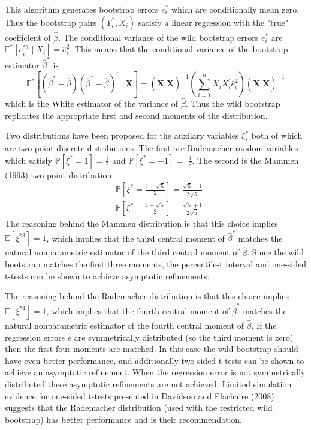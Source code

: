 \documentclass[10pt]{article}
\begin{document}
This algorithm generates bootstrap errors $e_{i}^{*}$ which are conditionally mean zero. Thus the bootstrap pairs $\left(Y_{i}^{*}, X_{i}\right)$ satisfy a linear regression with the "true" coefficient of $\widehat{\beta}$. The conditional variance of the wild bootstrap errors $e_{i}^{*}$ are $\mathbb{E}^{*}\left[e_{i}^{* 2} \mid X_{i}\right]=\widehat{e}_{i}^{2}$. This means that the conditional variance of the bootstrap estimator $\widehat{\beta}^{*}$ is
$$
\mathbb{E}^{*}\left[\left(\widehat{\beta}^{*}-\widehat{\beta}\right)\left(\widehat{\beta}^{*}-\widehat{\beta}\right)^{\prime} \mid \boldsymbol{X}\right]=\left(\boldsymbol{X}^{\prime} \boldsymbol{X}\right)^{-1}\left(\sum_{i=1}^{n} X_{i} X_{i}^{\prime} \widehat{e}_{i}^{2}\right)\left(\boldsymbol{X}^{\prime} \boldsymbol{X}\right)^{-1}
$$
which is the White estimator of the variance of $\widehat{\beta}$. Thus the wild bootstrap replicates the appropriate first and second moments of the distribution.

Two distributions have been proposed for the auxilary variables $\xi_{i}^{*}$ both of which are two-point discrete distributions. The first are Rademacher random variables which satisfy $\mathbb{P}\left[\xi^{*}=1\right]=\frac{1}{2}$ and $\mathbb{P}\left[\xi^{*}=-1\right]=$ $\frac{1}{2}$. The second is the Mammen (1993) two-point distribution
$$
\begin{aligned}
&\mathbb{P}\left[\xi^{*}=\frac{1+\sqrt{5}}{2}\right]=\frac{\sqrt{5}-1}{2 \sqrt{5}} \\
&\mathbb{P}\left[\xi^{*}=\frac{1-\sqrt{5}}{2}\right]=\frac{\sqrt{5}+1}{2 \sqrt{5}}
\end{aligned}
$$
The reasoning behind the Mammen distribution is that this choice implies $\mathbb{E}\left[\xi^{* 3}\right]=1$, which implies that the third central moment of $\widehat{\beta}^{*}$ matches the natural nonparametric estimator of the third central moment of $\widehat{\beta}$. Since the wild bootstrap matches the first three moments, the percentile-t interval and one-sided t-tests can be shown to achieve asymptotic refinements.

The reasoning behind the Rademacher distribution is that this choice implies $\mathbb{E}\left[\xi^{* 4}\right]=1$, which implies that the fourth central moment of $\widehat{\beta}^{*}$ matches the natural nonparametric estimator of the fourth central moment of $\widehat{\beta}$. If the regression errors $e$ are symmetrically distributed (so the third moment is zero) then the first four moments are matched. In this case the wild bootstrap should have even better performance, and additionally two-sided t-tests can be shown to achieve an asymptotic refinement. When the regression error is not symmetrically distributed these asymptotic refinements are not achieved. Limited simulation evidence for one-sided t-tests presented in Davidson and Flachaire (2008) suggests that the Rademacher distribution (used with the restricted wild bootstrap) has better performance and is their recommendation.
\end{document}
